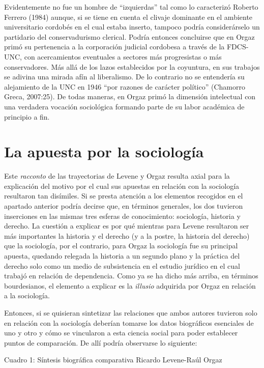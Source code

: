 Evidentemente no fue un hombre de ``izquierdas'' tal como lo caracterizó Roberto Ferrero (1984) aunque, si se tiene en cuenta el clivaje dominante en el ambiente universitario cordobés en el cual estaba inserto, tampoco podría considerárselo un partidario del conservadurismo clerical. Podría entonces concluirse que en Orgaz primó su pertenencia a la corporación judicial cordobesa a través de la FDCS-UNC, con acercamientos eventuales a sectores más progresistas o más conservadores. Más allá de los lazos establecidos por la coyuntura, en sus trabajos se adivina una mirada afín al liberalismo. De lo contrario no se entendería su alejamiento de la UNC en 1946 ``por razones de carácter político'' (Chamorro Greca, 2007:25). De todas maneras, en Orgaz primó la dimensión intelectual con una verdadera vocación sociológica formando parte de su labor académica de principio a fin.

\section{La apuesta por la sociología}

Este \emph{racconto} de las trayectorias de Levene y Orgaz resulta axial para la explicación del motivo por el cual sus apuestas en relación con la sociología resultaron tan disímiles. Si se presta atención a los elementos recogidos en el apartado anterior podría decirse que, en términos generales, los dos tuvieron inserciones en las mismas tres esferas de conocimiento: sociología, historia y derecho. La cuestión a explicar es por qué mientras para Levene resultaron ser más importantes la historia y el derecho (y a la postre, la historia del derecho) que la sociología, por el contrario, para Orgaz la sociología fue su principal apuesta, quedando relegada la historia a un segundo plano y la práctica del derecho solo como un medio de subsistencia en el estudio jurídico en el cual trabajó en relación de dependencia. Como ya se ha dicho más arriba, en términos bourdesianos, el elemento a explicar es la \emph{illusio} adquirida por Orgaz en relación a la sociología.

Entonces, si se quisieran sintetizar las relaciones que ambos autores tuvieron solo en relación con la sociología deberían tomarse los datos biográficos esenciales de uno y otro y cómo se vincularon a esta ciencia social para poder establecer puntos de comparación. De allí podría observarse lo siguiente:

Cuadro 1: Síntesis biográfica comparativa Ricardo Levene-Raúl Orgaz

